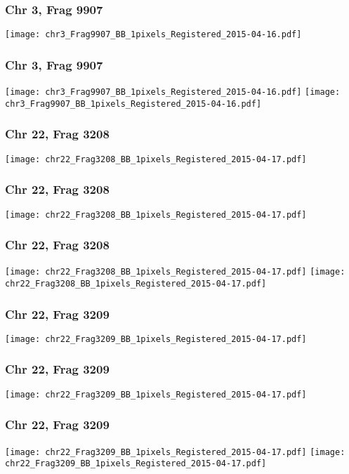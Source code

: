 \documentclass[10pt,dvipsnames,table]{beamer}
\begin{document}
\begin{frame}
\frametitle{Chr 3, Frag 9907}
\begin{center}
\texttt{[image: chr3\_Frag9907\_BB\_1pixels\_Registered\_2015-04-16.pdf]}
\end{center}
\end{frame}

\begin{frame}
\frametitle{Chr 3, Frag 9907}
\begin{center}
\texttt{[image: chr3\_Frag9907\_BB\_1pixels\_Registered\_2015-04-16.pdf]}
\texttt{[image: chr3\_Frag9907\_BB\_1pixels\_Registered\_2015-04-16.pdf]}
\end{center}
\end{frame}

\begin{frame}
\frametitle{Chr 22, Frag 3208}
\begin{center}
\texttt{[image: chr22\_Frag3208\_BB\_1pixels\_Registered\_2015-04-17.pdf]}
\end{center}
\end{frame}

\begin{frame}
\frametitle{Chr 22, Frag 3208}
\begin{center}
\texttt{[image: chr22\_Frag3208\_BB\_1pixels\_Registered\_2015-04-17.pdf]}
\end{center}
\end{frame}

\begin{frame}
\frametitle{Chr 22, Frag 3208}
\begin{center}
\texttt{[image: chr22\_Frag3208\_BB\_1pixels\_Registered\_2015-04-17.pdf]}
\texttt{[image: chr22\_Frag3208\_BB\_1pixels\_Registered\_2015-04-17.pdf]}
\end{center}
\end{frame}

\begin{frame}
\frametitle{Chr 22, Frag 3209}
\begin{center}
\texttt{[image: chr22\_Frag3209\_BB\_1pixels\_Registered\_2015-04-17.pdf]}
\end{center}
\end{frame}

\begin{frame}
\frametitle{Chr 22, Frag 3209}
\begin{center}
\texttt{[image: chr22\_Frag3209\_BB\_1pixels\_Registered\_2015-04-17.pdf]}
\end{center}
\end{frame}

\begin{frame}
\frametitle{Chr 22, Frag 3209}
\begin{center}
\texttt{[image: chr22\_Frag3209\_BB\_1pixels\_Registered\_2015-04-17.pdf]}
\texttt{[image: chr22\_Frag3209\_BB\_1pixels\_Registered\_2015-04-17.pdf]}
\end{center}
\end{frame}
\end{document}
